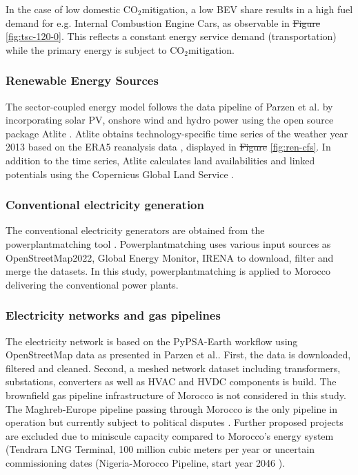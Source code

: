 \documentclass[5p,numafflabel]{elsarticle}
\newcommand{\co}{\ce{CO2}~}
\def\co{CO${}_2${\:}}
\providecommand{\DIFaddtex}[1]{{\protect\color{blue}\uwave{#1}}} %
\providecommand{\DIFdeltex}[1]{{\protect\color{red}\sout{#1}}}                      %
\providecommand{\DIFaddbegin}{} %
\providecommand{\DIFaddend}{} %
\providecommand{\DIFdelbegin}{} %
\providecommand{\DIFdelend}{} %
\providecommand{\DIFadd}[1]{\texorpdfstring{\DIFaddtex{#1}}{#1}} %
\providecommand{\DIFdel}[1]{\texorpdfstring{\DIFdeltex{#1}}{}} %
\newcommand{\DIFscaledelfig}{0.5}
\newlength{\DIFdelgraphicswidth} %
\newlength{\DIFdelgraphicsheight} %
\newcommand{\DIFaddincludegraphics}[2][]{{\color{blue}\fbox{\DIFOincludegraphics[#1]{#2}}}} %
\newcommand{\DIFdelincludegraphics}[2][]{%
\sbox{\DIFdelgraphicsbox}{\DIFOincludegraphics[#1]{#2}}%
\settoboxwidth{\DIFdelgraphicswidth}{\DIFdelgraphicsbox} %
\settoboxtotalheight{\DIFdelgraphicsheight}{\DIFdelgraphicsbox} %
\scalebox{\DIFscaledelfig}{%
\parbox[b]{\DIFdelgraphicswidth}{\usebox{\DIFdelgraphicsbox}\\[-\baselineskip] \rule{\DIFdelgraphicswidth}{0em}}\llap{\resizebox{\DIFdelgraphicswidth}{\DIFdelgraphicsheight}{%
\setlength{\unitlength}{\DIFdelgraphicswidth}%
\begin{picture}(1,1)%
\thicklines\linethickness{2pt} %
{\color[rgb]{1,0,0}\put(0,0){\framebox(1,1){}}}%
{\color[rgb]{1,0,0}\put(0,0){\line( 1,1){1}}}%
{\color[rgb]{1,0,0}\put(0,1){\line(1,-1){1}}}%
\end{picture}%
}\hspace*{3pt}}} %
} %
\DeclareRobustCommand{\DIFaddbegin}{\DIFOaddbegin \let\includegraphics\DIFaddincludegraphics} %
\DeclareRobustCommand{\DIFaddend}{\DIFOaddend \let\includegraphics\DIFOincludegraphics} %
\DeclareRobustCommand{\DIFdelbegin}{\DIFOdelbegin \let\includegraphics\DIFdelincludegraphics} %
\DeclareRobustCommand{\DIFdelend}{\DIFOaddend \let\includegraphics\DIFOincludegraphics} %
\begin{document}
In the case of low domestic \co mitigation, a low BEV share results in a high fuel demand for e.g. Internal Combustion Engine Cars, as observable in \DIFdelbegin \DIFdel{Figure }\DIFdelend \DIFaddbegin \DIFadd{Supplementary Fig. }\DIFaddend \ref{fig:tsc-120-0}. This reflects a constant energy service demand (transportation) while the primary energy is subject to \co mitigation.



\subsubsection*{Renewable Energy Sources}
The sector-coupled energy model follows the data pipeline of Parzen et al.\cite{Parzen2023} by incorporating solar PV, onshore wind and hydro power using the open source package Atlite \cite{Hofmann2021}.
Atlite obtains technology-specific time series of the weather year 2013 based on the ERA5 reanalysis data \cite{Hersbach2020}, displayed in \DIFdelbegin \DIFdel{Figure }\DIFdelend \DIFaddbegin \DIFadd{Supplementary Fig. }\DIFaddend \ref{fig:ren-cfs}. In addition to the time series, Atlite calculates land availabilities and linked potentials using the Copernicus Global Land Service \cite{Buchhorn2020}.






\subsubsection*{Conventional electricity generation}
The conventional electricity generators are obtained from the powerplantmatching tool \cite{Powerplantmatching2019}. Powerplantmatching uses various input sources as OpenStreetMap2022, Global Energy Monitor, IRENA \cite{IRENA2022, OpenStreetMap2022, GlobalEnergyMonitor} to download, filter and merge the datasets. 
In this study, powerplantmatching is applied to Morocco delivering the conventional power plants.

\subsubsection*{Electricity networks and gas pipelines}
The electricity network is based on the PyPSA-Earth workflow using OpenStreetMap data \cite{OpenStreetMap2022} as presented in Parzen et al.\cite{Parzen2023}. First, the data is downloaded, filtered and cleaned. Second, a meshed network dataset including transformers, substations, converters as well as HVAC and HVDC components is build\cite{Parzen2023}. 
The brownfield gas pipeline infrastructure of Morocco is not considered in this study. The Maghreb-Europe pipeline passing through Morocco is the only pipeline in operation but currently subject to political disputes \cite{Rachidi2022}. Further proposed projects are excluded due to  miniscule capacity compared to Morocco's energy system (Tendrara LNG Terminal, 100 million cubic meters per year or uncertain commissioning dates (Nigeria-Morocco Pipeline, start year 2046 \cite{GEM2023b}).
\end{document}
